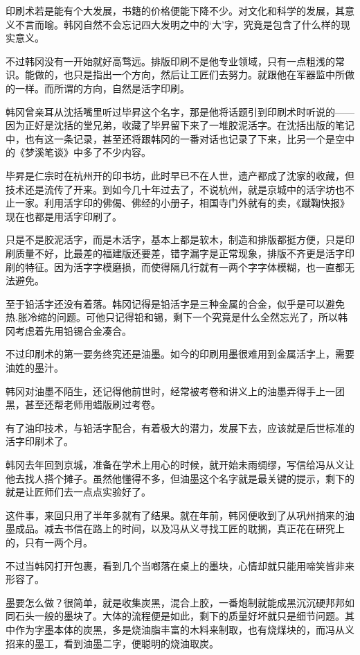 印刷术若是能有个大发展，书籍的价格便能下降不少。对文化和科学的发展，其意义不言而喻。韩冈自然不会忘记四大发明之中的‘大’字，究竟是包含了什么样的现实意义。

不过韩冈没有一开始就好高骛远。排版印刷不是他专业领域，只有一点粗浅的常识。能做的，也只是指出一个方向，然后让工匠们去努力。就跟他在军器监中所做的一样。而所谓的方向，自然是活字印刷。

韩冈曾亲耳从沈括嘴里听过毕昇这个名字，那是他将话题引到印刷术时听说的——因为正好是沈括的堂兄弟，收藏了毕昇留下来了一堆胶泥活字。在沈括出版的笔记中，也有这一条记录，甚至还将跟韩冈的一番对话也记录了下来，比另一个是空中的《梦溪笔谈》中多了不少内容。

毕昇是仁宗时在杭州开的印书坊，此时早已不在人世，遗产都成了沈家的收藏，但技术还是流传了开来。到如今几十年过去了，不说杭州，就是京城中的活字坊也不止一家。利用活字印的佛偈、佛经的小册子，相国寺门外就有的卖，《蹴鞠快报》现在也都是用活字印刷了。

只是不是胶泥活字，而是木活字，基本上都是软木，制造和排版都挺方便，只是印刷质量不好，比最差的福建版还要差，错字漏字是正常现象，排版不齐更是活字印刷的特征。因为活字字模磨损，而使得隔几行就有一两个字字体模糊，也一直都无法避免。

至于铅活字还没有着落。韩冈记得是铅活字是三种金属的合金，似乎是可以避免热.胀冷缩的问题。可他只记得铅和锡，剩下一个究竟是什么全然忘光了，所以韩冈考虑着先用铅锡合金凑合。

不过印刷术的第一要务终究还是油墨。如今的印刷用墨很难用到金属活字上，需要油姓的墨汁。

韩冈对油墨不陌生，还记得他前世时，经常被考卷和讲义上的油墨弄得手上一团黑，甚至还帮老师用蜡版刷过考卷。

有了油印技术，与铅活字配合，有着极大的潜力，发展下去，应该就是后世标准的活字印刷术了。

韩冈去年回到京城，准备在学术上用心的时候，就开始未雨绸缪，写信给冯从义让他去找人搭个摊子。虽然他懂得不多，但油墨这个名字就是最关键的提示，剩下的就是让匠师们去一点点实验好了。

这件事，来回只用了半年多就有了结果。就在年前，韩冈便收到了从巩州捎来的油墨成品。减去书信在路上的时间，以及冯从义寻找工匠的耽搁，真正花在研究上的，只有一两个月。

不过当韩冈打开包裹，看到几个当啷落在桌上的墨块，心情却就只能用啼笑皆非来形容了。

墨要怎么做？很简单，就是收集炭黑，混合上胶，一番炮制就能成黑沉沉硬邦邦如同石头一般的墨块了。大体的流程便是如此，剩下的质量好坏就只是细节问题。其中作为字墨本体的炭黑，多是烧油脂丰富的木料来制取，也有烧煤块的，而冯从义招来的墨工，看到油墨二字，便聪明的烧油取炭。

